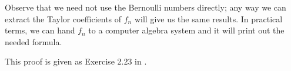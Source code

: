 \documentclass[12pt]{article}
\begin{document}
Observe that we need not use the Bernoulli numbers directly; any way we can extract the Taylor coefficients of $f_n$ will give us the same results.  In practical terms, we can hand $f_n$ to a computer algebra system and it will print out the needed formula.

This proof is given as Exercise 2.23 in .
\end{document}
